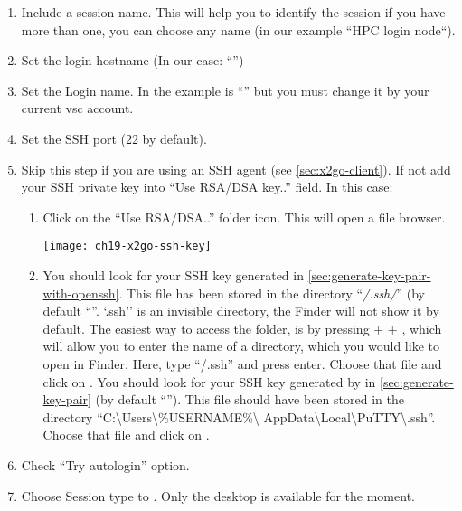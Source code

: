 \begin{enumerate}
    \item  Include a session name. This will help you to identify 
    the session if you have more than one, you can choose any name (in our example ``HPC login node``).
    \item  Set the login hostname (In our case: ``\strong{\emph{\loginnode}}'')
    \item  Set the Login name. In the example is ``\strong{\userid}'' but you must change it by your
    current vsc account.
    \item  Set the SSH port (22 by default).
    \item  Skip this step if you are using an SSH agent (see \autoref{sec:x2go-client}).
    If not add your SSH private key into ``Use RSA/DSA key..'' field. In this case:
    \begin{enumerate}
     \item Click on the ``Use RSA/DSA..'' folder icon. This will open a file browser. 
     \begin{center}
       \texttt{[image: ch19-x2go-ssh-key]}
     \end{center}
     \item
     \ifmacORlinux
     You should look for your  SSH key generated in \autoref{sec:generate-key-pair-with-openssh}.
     This file has been stored in the directory ``\emph{\tilde/.ssh/}'' (by default ``''.
     `.ssh'' is an invisible directory, the Finder will
      not show it by default. The easiest way to access the folder, is by pressing
       +  + , which will allow you to enter the name of a directory, which
     you would like to open in Finder. Here, type ``\tilde/.ssh'' and press enter.
     Choose that file and click on .
     \fi
     \ifwindows
     You should look for your  SSH key generated by  in \autoref{sec:generate-key-pair}
     (by default ``''). This file should have been stored in the directory
     ``C:\textbackslash Users\textbackslash \%USERNAME\%\textbackslash
     AppData\textbackslash Local\textbackslash PuTTY\textbackslash .ssh''.
     Choose that file and click on .
     \fi
    \end{enumerate}
    \item  Check ``Try autologin'' option.
    \item  Choose Session type to . Only the  desktop is available for the moment.

\end{enumerate}
